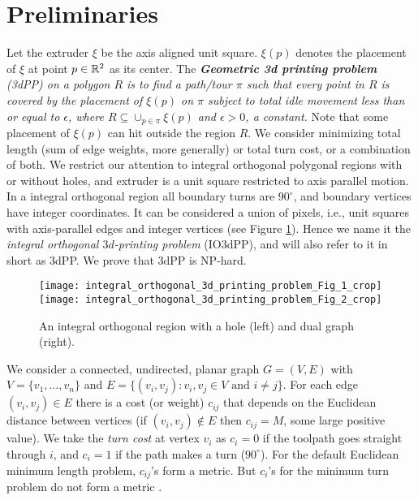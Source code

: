  \section{Preliminaries}
Let the extruder $\xi$ be the axis aligned unit square.
$\xi(p)$ denotes the placement of $\xi$ at point $p \in {\mathbb R}^2$ as its center.
The \textit{ {\bfseries Geometric 3d printing problem} (3dPP) on a polygon $R$ is to find a path/tour $\pi$ such that every point in $R$ is covered by the placement of $\xi(p)$ on $\pi$ subject to total idle movement less than or equal to $\epsilon$, where $R \subseteq \cup_{p \in \pi} \xi(p)$ and $\epsilon > 0$, a constant.}
Note that some placement of $\xi(p)$ can hit outside the region $R$.
We consider minimizing total length (sum of edge weights, more generally) or total turn cost, or a combination of both. 
We restrict our attention to integral orthogonal polygonal regions with or without holes, and extruder is a unit square restricted to axis parallel motion.
In a integral orthogonal region all boundary turns are $90^{\circ}$, and boundary vertices have integer coordinates.
It can be considered a union of pixels, i.e., unit squares with axis-parallel edges and integer vertices (see Figure \ref{fig:inteortho3dprintprob}).
Hence we name it the \emph{integral orthogonal $3d$-printing problem} (IO3dPP), and will also refer to it in short as 3dPP.
We prove that 3dPP is NP-hard. %

\begin{figure}[htp!] 
  \centering
  \texttt{[image: integral\_orthogonal\_3d\_printing\_problem\_Fig\_1\_crop]}
  \hspace*{0.03in}
  \texttt{[image: integral\_orthogonal\_3d\_printing\_problem\_Fig\_2\_crop]}
  \caption{\label{fig:inteortho3dprintprob}
    An integral orthogonal region with a hole (left) and dual graph (right).
  }
\end{figure}


We consider a connected, undirected, planar graph $G=(V,E)$ with $V= \{v_1, \dots, v_n\}$ and $E= \{(v_i, v_j): v_i, v_j \in V \text{ and } i \neq j\}$.
For each edge $(v_i, v_j) \in E$ there is a cost (or weight) $c_{ij}$ that depends on the Euclidean distance between vertices (if $(v_i, v_j) \not\in E$ then $c_{ij} = M$, some large positive value).
We take the \textit{turn cost} at vertex $v_i$ as $c_i = 0$ if the toolpath goes straight through $i$, and $c_i = 1$ if the path makes a turn ($90^{\circ}$). 
For the default Euclidean minimum length problem, $c_{ij}$'s form a metric.
But $c_i$'s for the minimum turn problem do not form a metric \cite{ArBeDeFeMiSe2005}.

